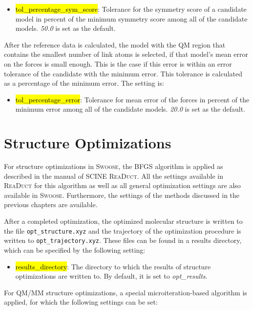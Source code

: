 \documentclass[]{tufte-book}
\begin{document}
{{\begin{itemize}
\item \hl{tol\_percentage\_sym\_score}: Tolerance for the symmetry score of a candidate model in percent of the minimum symmetry score among all of the candidate models. \textit{50.0} is set as the default.
\end{itemize}

After the reference data is calculated, the model with the QM region that contains the smallest number of link atoms is selected, if that model's mean error on the forces is small enough. This is the case if this error is within an error tolerance of the candidate with the minimum error. This tolerance is calculated as a percentage of the minimum error. The setting is:

\begin{itemize}
\item \hl{tol\_percentage\_error}: Tolerance for mean error of the forces in percent of the minimum error among all of the candidate models. \textit{20.0} is set as the default.
\end{itemize}


\chapter{Structure Optimizations}

For structure optimizations in \textsc{Swoose}, the BFGS algorithm is applied as described in the manual of SCINE \textsc{ReaDuct}\cite{readuct}. All the settings available in \textsc{ReaDuct} for this algorithm as well as all general optimization settings are also available in \textsc{Swoose}. Furthermore, the settings of the methods discussed in the previous chapters are available.

After a completed optimization, the optimized molecular structure is written to the file \texttt{opt\_structure.xyz} and the trajectory of the optimization procedure is written to \texttt{opt\_trajectory.xyz}. These files can be found in a results directory, which can be specified by the following setting:

\begin{itemize}
\item \hl{results\_directory}: The directory to which the results of structure optimizations are written to. By default, it is set to \textit{opt\_results}.
\end{itemize}

For QM/MM structure optimizations, a special microiteration-based algorithm is applied, for which the following settings can be set:

}}
\end{document}
